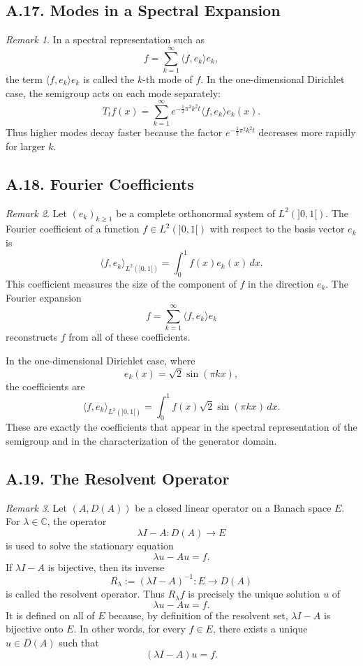 \documentclass[11pt]{article}
\theoremstyle{definition}
\theoremstyle{remark}
\newtheorem{remark}{Remark}
\begin{document}
\subsection*{A.17. Modes in a Spectral Expansion}
\begin{remark}
In a spectral representation such as
\[
f=\sum_{k=1}^{\infty}\langle f,e_k\rangle e_k,
\]
the term \(\langle f,e_k\rangle e_k\) is called the \(k\)-th mode of \(f\). In the one-dimensional Dirichlet case, the semigroup acts on each mode separately:
\[
T_t f(x)=\sum_{k=1}^{\infty} e^{-\frac12\pi^2 k^2 t}\langle f,e_k\rangle e_k(x).
\]
Thus higher modes decay faster because the factor \(e^{-\frac12\pi^2 k^2 t}\) decreases more rapidly for larger \(k\).
\end{remark}

\subsection*{A.18. Fourier Coefficients}
\begin{remark}
Let \((e_k)_{k\ge 1}\) be a complete orthonormal system of \(L^2(]0,1[)\). The Fourier coefficient of a function \(f\in L^2(]0,1[)\) with respect to the basis vector \(e_k\) is
\[
\langle f,e_k\rangle_{L^2(]0,1[)}
=
\int_0^1 f(x)e_k(x)\,dx.
\]
This coefficient measures the size of the component of \(f\) in the direction \(e_k\). The Fourier expansion
\[
f=\sum_{k=1}^{\infty}\langle f,e_k\rangle e_k
\]
reconstructs \(f\) from all of these coefficients.

In the one-dimensional Dirichlet case, where
\[
e_k(x)=\sqrt{2}\sin(\pi kx),
\]
the coefficients are
\[
\langle f,e_k\rangle_{L^2(]0,1[)}
=
\int_0^1 f(x)\sqrt{2}\sin(\pi kx)\,dx.
\]
These are exactly the coefficients that appear in the spectral representation of the semigroup and in the characterization of the generator domain.
\end{remark}

\subsection*{A.19. The Resolvent Operator}
\begin{remark}
Let \((A,D(A))\) be a closed linear operator on a Banach space \(E\). For \(\lambda\in\mathbb C\), the operator
\[
\lambda I-A:D(A)\to E
\]
is used to solve the stationary equation
\[
\lambda u-Au=f.
\]
If \(\lambda I-A\) is bijective, then its inverse
\[
R_\lambda:=(\lambda I-A)^{-1}:E\to D(A)
\]
is called the resolvent operator. Thus \(R_\lambda f\) is precisely the unique solution \(u\) of
\[
\lambda u-Au=f.
\]
It is defined on all of \(E\) because, by definition of the resolvent set, \(\lambda I-A\) is bijective onto \(E\). In other words, for every \(f\in E\), there exists a unique \(u\in D(A)\) such that
\[
(\lambda I-A)u=f.
\]
\end{remark}
\end{document}
